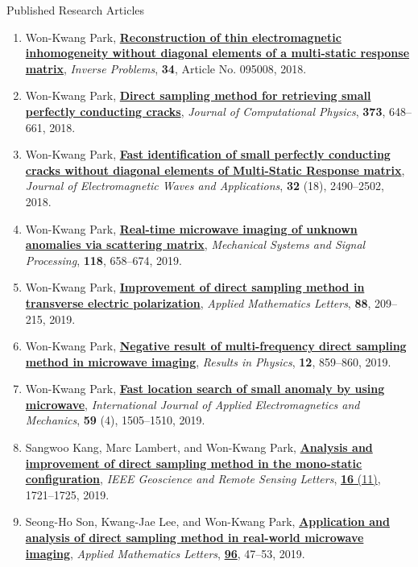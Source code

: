 \documentclass{resume} %
\begin{document}
\begin{rSection}{Published Research Articles}
\begin{enumerate}
\item\label{A-IP2018B} Won-Kwang Park, \href{https://doi.org/10.1088/1361-6420/aad20c}{\textbf{Reconstruction of thin electromagnetic inhomogeneity without diagonal elements of a multi-static response matrix}}, \textit{Inverse Problems}, \textbf{34}, Article No. 095008, 2018.
\item\label{A-JCOMP2018} Won-Kwang Park, \href{https://doi.org/10.1016/j.jcp.2018.07.014}{\textbf{Direct sampling method for retrieving small perfectly conducting cracks}}, \textit{Journal of Computational Physics}, \textbf{373}, 648--661, 2018.
\item\label{A-JEMWA2018} Won-Kwang Park, \href{https://doi.org/10.1080/09205071.2018.1518162}{\textbf{Fast identification of small perfectly conducting cracks without diagonal elements of Multi-Static Response matrix}}, \textit{Journal of Electromagnetic Waves and Applications}, \textbf{32} (18), 2490--2502, 2018.
\item\label{A-MSSP2019} Won-Kwang Park, \href{https://doi.org/10.1016/j.ymssp.2018.09.012}{\textbf{Real-time microwave imaging of unknown anomalies via scattering matrix}}, \textit{Mechanical Systems and Signal Processing}, \textbf{118}, 658--674, 2019.
\item\label{A-AML2019A} Won-Kwang Park, \href{https://doi.org/10.1016/j.aml.2018.09.001}{\textbf{Improvement of direct sampling method in transverse electric polarization}}, \textit{Applied Mathematics Letters}, \textbf{88}, 209--215, 2019.
\item\label{A-RINP2019} Won-Kwang Park, \href{https://doi.org/10.1016/j.rinp.2018.11.015}{\textbf{Negative result of multi-frequency direct sampling method in microwave imaging}}, \textit{Results in Physics}, \textbf{12}, 859--860, 2019.
\item\label{A-IJAEM2019} Won-Kwang Park, \href{https://doi.org/10.3233/JAE-171107}{\textbf{Fast location search of small anomaly by using microwave}}, \textit{International Journal of Applied Electromagnetics and Mechanics}, \textbf{59} (4), 1505--1510, 2019.
\item\label{A-GRSL2019} Sangwoo Kang, Marc Lambert, and Won-Kwang Park, \href{https://doi.org/10.1109/LGRS.2019.2906366}{\textbf{Analysis and improvement of direct sampling method in the mono-static configuration}}, \textit{IEEE Geoscience and Remote Sensing Letters}, \href{https://ieeexplore.ieee.org/xpl/tocresult.jsp?isnumber=8887580&punumber=8859}{\textbf{16} (11)}, 1721--1725, 2019.
\item\label{A-AML2019B} Seong-Ho Son, Kwang-Jae Lee, and Won-Kwang Park, \href{https://doi.org/10.1016/j.aml.2019.04.016}{\textbf{Application and analysis of direct sampling method in real-world microwave imaging}}, \textit{Applied Mathematics Letters}, \href{https://www.sciencedirect.com/science/journal/08939659/96/supp/C}{\textbf{96}}, 47--53, 2019.

\end{enumerate}
\end{rSection}
\end{document}

